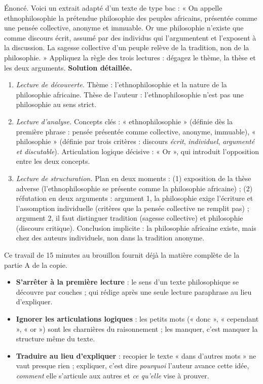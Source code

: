 \documentclass[11pt]{article}
\begin{document}
\begin{exoresolu}
Énoncé. Voici un extrait adapté d'un texte de type bac : « On appelle ethnophilosophie la prétendue philosophie des peuples africains, présentée comme une pensée collective, anonyme et immuable. Or une philosophie n'existe que comme discours écrit, assumé par des individus qui l'argumentent et l'exposent à la discussion. La sagesse collective d'un peuple relève de la tradition, non de la philosophie. » Appliquez la règle des trois lectures : dégagez le thème, la thèse et les deux arguments.
\tcblower
\textbf{Solution détaillée.}
\begin{enumerate}
\item \emph{Lecture de découverte.} Thème : l'ethnophilosophie et la nature de la philosophie africaine. Thèse de l'auteur : l'ethnophilosophie n'est pas une philosophie au sens strict.
\item \emph{Lecture d'analyse.} Concepts clés : « ethnophilosophie » (définie dès la première phrase : pensée présentée comme collective, anonyme, immuable), « philosophie » (définie par trois critères : discours \emph{écrit}, \emph{individuel}, \emph{argumenté et discutable}). Articulation logique décisive : « Or », qui introduit l'opposition entre les deux concepts.
\item \emph{Lecture de structuration.} Plan en deux moments : (1) exposition de la thèse adverse (l'ethnophilosophie se présente comme la philosophie africaine) ; (2) réfutation en deux arguments : argument 1, la philosophie exige l'écriture et l'assomption individuelle (critères que la pensée collective ne remplit pas) ; argument 2, il faut distinguer tradition (sagesse collective) et philosophie (discours critique). Conclusion implicite : la philosophie africaine existe, mais chez des auteurs individuels, non dans la tradition anonyme.
\end{enumerate}
Ce travail de 15 minutes au brouillon fournit déjà la matière complète de la partie A de la copie.
\end{exoresolu}

\begin{attention}
\begin{itemize}
\item \textbf{S'arrêter à la première lecture} : le sens d'un texte philosophique se découvre par couches ; qui rédige après une seule lecture paraphrase au lieu d'expliquer.
\item \textbf{Ignorer les articulations logiques} : les petits mots (« donc », « cependant », « or ») sont les charnières du raisonnement ; les manquer, c'est manquer la structure même du texte.
\item \textbf{Traduire au lieu d'expliquer} : recopier le texte « dans d'autres mots » ne vaut presque rien ; expliquer, c'est dire \emph{pourquoi} l'auteur avance cette idée, \emph{comment} elle s'articule aux autres et \emph{ce qu'elle} vise à prouver.
\end{itemize}
\end{attention}
\end{document}
